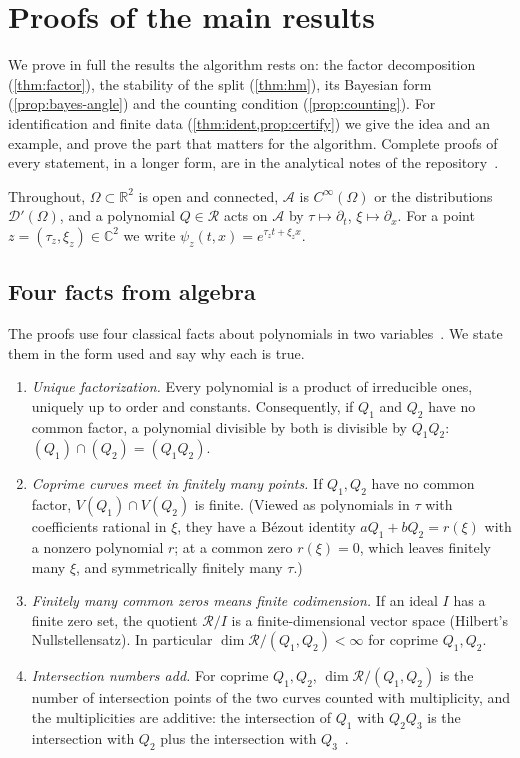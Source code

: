 \documentclass[11pt]{article}
\theoremstyle{plain}
\theoremstyle{definition}
\theoremstyle{remark}
\newcommand{\R}{\mathbb{R}}
\newcommand{\C}{\mathbb{C}}
\newcommand{\ring}{\mathcal{R}}            %
\newcommand{\Var}{V}                        %
\begin{document}
\section{Proofs of the main results}\label{sm:proofs}
We prove in full the results the algorithm rests on: the factor decomposition (\cref{thm:factor}), the stability of the
split (\cref{thm:hm}), its Bayesian form (\cref{prop:bayes-angle}) and the counting condition (\cref{prop:counting}).
For identification and finite data (\cref{thm:ident,prop:certify}) we give the idea and an example, and prove the part
that matters for the algorithm. Complete proofs of every statement, in a longer form, are in the analytical notes of the
repository~\cite{Pri26code}.

Throughout, $\Omega\subset\R^2$ is open and connected, $\mathcal A$ is $C^\infty(\Omega)$ or the distributions
$\mathcal D'(\Omega)$, and a polynomial $Q\in\ring$ acts on $\mathcal A$ by $\tau\mapsto\partial_t$, $\xi\mapsto\partial_x$.
For a point $z=(\tau_z,\xi_z)\in\C^2$ we write $\psi_z(t,x)=e^{\tau_zt+\xi_zx}$.

\subsection{Four facts from algebra}\label{sm:algebra}
The proofs use four classical facts about polynomials in two variables~\cite{CLO15,Ful08}. We state them in the form
used and say why each is true.
\begin{enumerate}[label=(F\arabic*), leftmargin=*]
\item \emph{Unique factorization.} Every polynomial is a product of irreducible ones, uniquely up to order and constants.
Consequently, if $Q_1$ and $Q_2$ have no common factor, a polynomial divisible by both is divisible by $Q_1Q_2$:
$(Q_1)\cap(Q_2)=(Q_1Q_2)$.
\item \emph{Coprime curves meet in finitely many points.} If $Q_1,Q_2$ have no common factor, $\Var(Q_1)\cap\Var(Q_2)$ is
finite. (Viewed as polynomials in $\tau$ with coefficients rational in $\xi$, they have a B\'ezout identity
$aQ_1+bQ_2=r(\xi)$ with a nonzero polynomial $r$; at a common zero $r(\xi)=0$, which leaves finitely many $\xi$, and
symmetrically finitely many $\tau$.)
\item \emph{Finitely many common zeros means finite codimension.} If an ideal $I$ has a finite zero set, the quotient
$\ring/I$ is a finite-dimensional vector space (Hilbert's Nullstellensatz). In particular $\dim\ring/(Q_1,Q_2)<\infty$
for coprime $Q_1,Q_2$.
\item \emph{Intersection numbers add.} For coprime $Q_1,Q_2$, $\dim\ring/(Q_1,Q_2)$ is the number of intersection points of
the two curves counted with multiplicity, and the multiplicities are additive: the intersection of $Q_1$ with $Q_2Q_3$
is the intersection with $Q_2$ plus the intersection with $Q_3$~\cite[Ch.~3]{Ful08}.
\end{enumerate}
\end{document}
